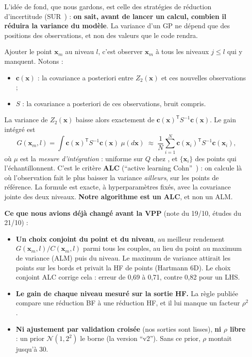 \documentclass[11pt,a4paper]{article}
\newcommand{\vx}{\bm{x}}
\newcommand{\vc}{\bm{c}}
\newcommand{\tp}{^{\mathsf{T}}}
\begin{document}
L'idée de fond, que nous gardons, est celle des stratégies de réduction d'incertitude (SUR~\cite{Bect12}) :
\textbf{on sait, avant de lancer un calcul, combien il réduira la variance du modèle}. La variance d'un GP ne
dépend que des positions des observations, et non des valeurs que le code rendra.

\begin{theorie}
Ajouter le point $\vx_m$ au niveau $l$, c'est observer $\vx_m$ à tous les niveaux $j\le l$ qui y manquent.
Notons :
\begin{itemize}
  \item $\vc(\vx)$ : la covariance a posteriori entre $Z_2(\vx)$ et ces nouvelles observations ;
  \item $S$ : la covariance a posteriori de ces observations, bruit compris.
\end{itemize}
La variance de $Z_2(\vx)$ baisse alors exactement de $\vc(\vx)\tp S^{-1}\vc(\vx)$. Le gain intégré est
\begin{equation}\label{eq:gain}
  G(\vx_m,l)=\int \vc(\vx)\tp S^{-1}\vc(\vx)\;\mu(d\vx)\;\approx\;\frac1N\sum_{i=1}^{N}\vc(\vx_i)\tp S^{-1}\vc(\vx_i),
\end{equation}
où $\mu$ est la \emph{mesure d'intégration} : uniforme sur $Q$ chez \cite{LGC15}, et $\{\vx_i\}$ des points
qui l'échantillonnent. C'est le critère \textbf{ALC} (\enquote{active learning Cohn}~\cite{Cohn96}) : on
calcule là où l'observation fait le plus baisser la variance \emph{ailleurs}, sur les points de référence.
La formule est exacte, à hyperparamètres fixés, avec la covariance jointe des deux niveaux.
\textbf{Notre algorithme est un ALC}, et non un ALM.
\end{theorie}

\textbf{Ce que nous avions déjà changé avant la VPP} (note du 19/10, études du 21/10) :
\begin{itemize}
  \item \textbf{Un choix conjoint du point et du niveau}, au meilleur rendement $G(\vx_m,l)/C(\vx_m,l)$ parmi
        tous les couples, au lieu du point au maximum de variance (ALM) puis du niveau. Le maximum de variance
        attirait les points sur les bords et privait la HF de points (Hartmann 6D). Le choix conjoint ALC
        corrige cela : erreur de 0,69 à 0,71, contre 0,82 pour un LHS.
  \item \textbf{Le gain de chaque niveau mesuré sur la sortie HF.} La règle publiée compare une réduction BF à
        une réduction HF, et il lui manque un facteur $\rho^2$.
  \item \textbf{Ni ajustement par validation croisée} (nos sorties sont lisses), \textbf{ni $\rho$ libre} :
        un prior $\mathcal{N}(1,2^2)$ le borne (la version \enquote{v2}). Sans ce prior, $\rho$ montait
        jusqu'à 30.
\end{itemize}
\end{document}
